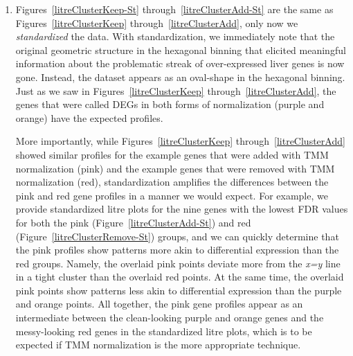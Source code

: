 \documentclass[11pt,a4paper,oldfontcommands,openany]{memoir}
\numberwithin{equation}{section} %
\begin{document}
\begin{enumerate}
\item Figures~\ref{litreClusterKeep-St} through~\ref{litreClusterAdd-St} are the same as Figures~\ref{litreClusterKeep} through~\ref{litreClusterAdd}, only now we \textit{standardized} the data. With standardization, we immediately note that the original geometric structure in the hexagonal binning that elicited meaningful information about the problematic streak of over-expressed liver genes is now gone. Instead, the dataset appears as an oval-shape in the hexagonal binning. Just as we saw in Figures~\ref{litreClusterKeep} through~\ref{litreClusterAdd}, the genes that were called DEGs in both forms of normalization (purple and orange) have the expected profiles.

More importantly, while Figures~\ref{litreClusterKeep} through~\ref{litreClusterAdd} showed similar profiles for the example genes that were added with TMM normalization (pink) and the example genes that were removed with TMM normalization (red), standardization amplifies the differences between the pink and red gene profiles in a manner we would expect. For example, we provide standardized litre plots for the nine genes with the lowest FDR values for both the pink (Figure~\ref{litreClusterAdd-St}) and red (Figure~\ref{litreClusterRemove-St}) groups, and we can quickly determine that the pink profiles show patterns more akin to differential expression than the red groups. Namely, the overlaid pink points deviate more from the \textit{x=y} line in a tight cluster than the overlaid red points. At the same time, the overlaid pink points show patterns less akin to differential expression than the purple and orange points. All together, the pink gene profiles appear as an intermediate between the clean-looking purple and orange genes and the messy-looking red genes in the standardized litre plots, which is to be expected if TMM normalization is the more appropriate technique.

\end{enumerate}
\end{document}

